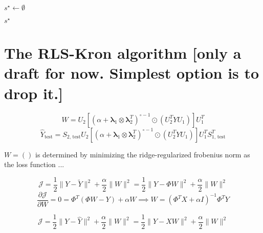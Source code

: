 \documentclass[sn-mathphys-num]{sn-jnl}%
\newcommand{\T}{^T}
\theoremstyle{thmstyleone}%
\theoremstyle{thmstyletwo}%
\theoremstyle{thmstylethree}%
\begin{document}
\begin{appendices}
\begin{function}[tb]
    $s^\star \gets \emptyset$  
    \BlankLine
    
    \BlankLine
    \Return $s^\star$
\end{function}


\FloatBarrier






\FloatBarrier
\section{The RLS-Kron algorithm [only a draft for now. Simplest option is to drop it.]}
\label{sec:rlskron}

\begin{equation}
    W = U_2
    [
        (\alpha + \mathbf{\lambda}_1 \otimes \mathbf{\lambda}_2\T)^{\circ -1}
        \odot (U_2\T Y U_1)
    ]
    U_1\T
\end{equation}
\begin{equation}
    \hat Y_\text{test} =
        S_\text{2, test}
        U_2
        [
            (\alpha + \mathbf{\lambda}_1 \otimes \mathbf{\lambda}_2\T)^{\circ -1}
            \odot (U_2\T Y U_1)
        ]
        U_1\T
        S_\text{1, test}\T
\end{equation}


$W=()$ is determined by minimizing the ridge-regularized frobenius norm as the loss function ...

\begin{equation}
    \mathcal{J} = \frac{1}{2} \|Y - \tilde Y\|^2 + \frac{\alpha}{2} \|W\|^2
    = \frac{1}{2} \|Y - \Phi W\|^2 + \frac{\alpha}{2} \|W\|^2
\end{equation}
%
\begin{equation} %
    \frac{\partial \mathcal{J}}{\partial W} = 0
    = \Phi \T (\Phi W - Y) + \alpha W
    \implies W = (\Phi\T X + \alpha I)^{-1} \Phi\T Y
\end{equation}

\begin{equation}
    \mathcal{J} = \frac{1}{2} \|Y - \hat Y\|^2 + \frac{\alpha}{2} \|W\|^2
    = \frac{1}{2} \|Y - XW\|^2 + \frac{\alpha}{2} \|W\|^2
\end{equation}


\end{appendices}
\end{document}
